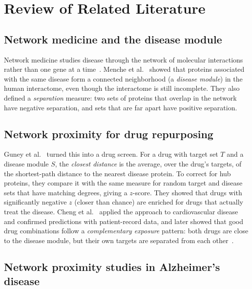 \section{Review of Related Literature}
\label{sec:rrl}

\subsection{Network medicine and the disease module}

Network medicine studies disease through the network of molecular interactions rather than one gene at a time~\cite{barabasi2011network}. Menche et al.~\cite{menche2015uncovering} showed that proteins associated with the same disease form a connected neighborhood (a \emph{disease module}) in the human interactome, even though the interactome is still incomplete. They also defined a \emph{separation} measure: two sets of proteins that overlap in the network have negative separation, and sets that are far apart have positive separation.

\subsection{Network proximity for drug repurposing}

Guney et al.~\cite{guney2016network} turned this into a drug screen. For a drug with target set $T$ and a disease module $S$, the \emph{closest distance} is the average, over the drug's targets, of the shortest-path distance to the nearest disease protein. To correct for hub proteins, they compare it with the same measure for random target and disease sets that have matching degrees, giving a $z$-score. They showed that drugs with significantly negative $z$ (closer than chance) are enriched for drugs that actually treat the disease. Cheng et al.~\cite{cheng2018network} applied the approach to cardiovascular disease and confirmed predictions with patient-record data, and later showed that good drug combinations follow a \emph{complementary exposure} pattern: both drugs are close to the disease module, but their own targets are separated from each other~\cite{cheng2019network}.

\subsection{Network proximity studies in Alzheimer's disease}

